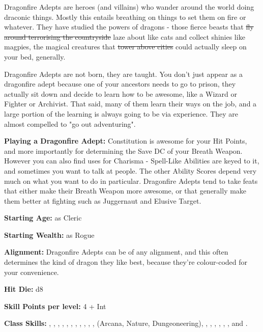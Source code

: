 
Dragonfire Adepts are heroes (and villains) who wander around the world doing draconic things. Mostly this entails breathing on things to set them on fire or whatever. They have studied the powers of dragons - those fierce beasts that \sout{fly around terrorising the countryside} laze about like cats and collect shinies like magpies, the magical creatures that \sout{tower above cities} could actually sleep on your bed, generally. 

Dragonfire Adepts are not born, they are taught. You don't just appear as a dragonfire adept because one of your ancestors needs to go to prison, they actually sit down and decide to learn how to be awesome, like a Wizard or Fighter or Archivist. That said, many of them learn their ways on the job, and a large portion of the learning is always going to be via experience. They are almost compelled to "go out adventuring". 

\textbf{Playing a Dragonfire Adept:} Constitution is awesome for your Hit Points, and more importantly for determining the Save DC of your Breath Weapon. However you can also find uses for Charisma - Spell-Like Abilities are keyed to it, and sometimes you want to talk at people. The other Ability Scores depend very much on what you want to do in particular. Dragonfire Adepts tend to take feats that either make their Breath Weapon more awesome, or that generally make them better at fighting such as Juggernaut and Elusive Target. 

\textbf{Starting Age:} as Cleric 

\textbf{Starting Wealth:} as Rogue 

\textbf{Alignment:} Dragonfire Adepts can be of any alignment, and this often determines the kind of dragon they like best, because they're colour-coded for your convenience. 

\textbf{Hit Die:} d8 

\textbf{Skill Points per level:} 4 + Int 

\textbf{Class Skills:} , , , , , , , , , , ,  (Arcana, Nature, Dungeoneering), , , , , , , and .

